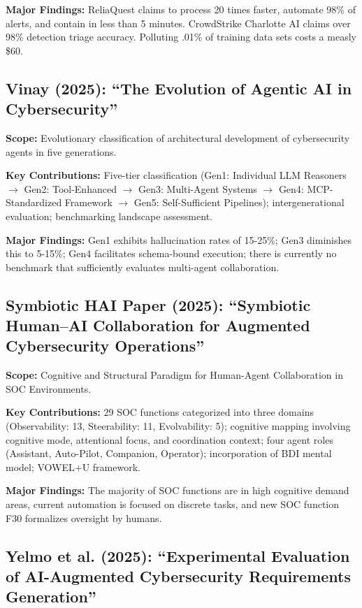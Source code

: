 \documentclass[journal]{IEEEtran}
\begin{document}
\textbf{Major Findings:} ReliaQuest claims to process 20 times faster, automate 98\% of alerts, and contain in less than 5 minutes. CrowdStrike Charlotte AI claims over 98\% detection triage accuracy. Polluting .01\% of training data sets costs a measly \$60.

\subsection{Vinay (2025): ``The Evolution of Agentic AI in Cybersecurity''}

\textbf{Scope:} Evolutionary classification of architectural development of cybersecurity agents in five generations.

\textbf{Key Contributions:} Five-tier classification (Gen1: Individual LLM Reasoners $\rightarrow$ Gen2: Tool-Enhanced $\rightarrow$ Gen3: Multi-Agent Systems $\rightarrow$ Gen4: MCP-Standardized Framework $\rightarrow$ Gen5: Self-Sufficient Pipelines); intergenerational evaluation; benchmarking landscape assessment.

\textbf{Major Findings:} Gen1 exhibits hallucination rates of 15-25\%; Gen3 diminishes this to 5-15\%; Gen4 facilitates schema-bound execution; there is currently no benchmark that sufficiently evaluates multi-agent collaboration.

\subsection{Symbiotic HAI Paper (2025): ``Symbiotic Human--AI Collaboration for Augmented Cybersecurity Operations''}

\textbf{Scope:} Cognitive and Structural Paradigm for Human-Agent Collaboration in SOC Environments.

\textbf{Key Contributions:} 29 SOC functions categorized into three domains (Observability: 13, Steerability: 11, Evolvability: 5); cognitive mapping involving cognitive mode, attentional focus, and coordination context; four agent roles (Assistant, Auto-Pilot, Companion, Operator); incorporation of BDI mental model; VOWEL+U framework.

\textbf{Major Findings:} The majority of SOC functions are in high cognitive demand areas, current automation is focused on discrete tasks, and new SOC function F30 formalizes oversight by humans.

\subsection{Yelmo et al. (2025): ``Experimental Evaluation of AI-Augmented Cybersecurity Requirements Generation''}
\end{document}
